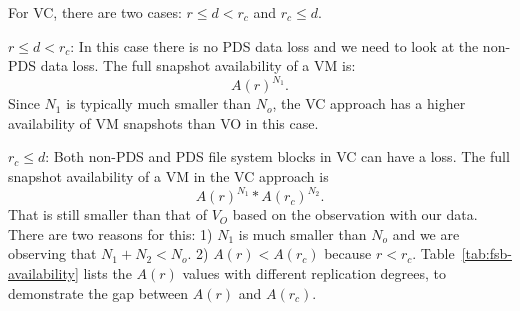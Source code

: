 For VC, there are two cases: $r \le d<r_c$ and $r_c \leq d$.  

\noindent $r \le d<r_c$:  In this case there is no PDS data loss and we need to look at the non-PDS data loss. 
The full snapshot availability of a VM is: 
\[
A(r)^{N_1}.
\]
Since $N_1$ is typically much smaller than $N_o$, 
the VC approach has a higher availability of VM snapshots than VO in this case.

\noindent $r_c \leq d$: Both non-PDS and PDS file system blocks in VC can have a loss.
The full snapshot availability of  a VM in the VC approach is
\[
A(r)^{N_1} * A(r_c)^{N_2}.
\]
That is still smaller than that of $V_O$ based on the observation with our data. There are two reasons for this:  
1) $N_1$ is much smaller than $N_o$ and we are observing that $N_1+N_2<N_o$. 
2)  $A(r) < A(r_c)$ because $r < r_c$.  
Table~\ref{tab:fsb-availability} lists the $A(r)$ values with
different replication degrees, to demonstrate the gap between  $A(r)$ and  $A(r_c)$.



